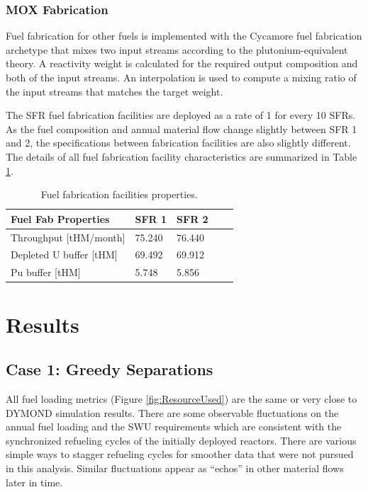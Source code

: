 \documentclass[12pt]{article}
\begin{document}
\subsubsection{MOX Fabrication}

Fuel fabrication for other fuels is implemented with the Cycamore fuel
fabrication archetype that mixes two input streams according to the
plutonium-equivalent theory\cite{Pueq}. A reactivity weight is calculated for
the required output composition and both of the input streams. An interpolation
is used to compute a mixing ratio of the input streams that matches the target
weight.

The SFR fuel fabrication facilities are deployed as a rate of 1 for every 10
SFRs. As the fuel composition and annual material flow change slightly between
SFR 1 and 2, the specifications between fabrication facilities are also slightly
different. The details of all fuel fabrication facility characteristics are
summarized in Table \ref{tab:fuelfab_1}.

\begin{table}[h!]
    \centering
    \begin{tabular}{lllll}
    \hline
    Fuel Fab Properties      &  SFR 1   &  SFR 2   \\
    \hline
    Throughput [tHM/month]   &  75.240  &  76.440  \\
    Depleted U buffer [tHM]  &  69.492  &  69.912  \\
    Pu buffer  [tHM]         &  5.748   &  5.856   \\
    \hline
    \end{tabular}
    \caption{Fuel fabrication facilities properties.}
    \label{tab:fuelfab_1}
\end{table}


\section{Results}

\subsection{Case 1: Greedy Separations}

All fuel loading metrics (Figure \ref{fig:ResourceUsed}) are the same or very
close to DYMOND simulation results. There are some observable fluctuations on the
annual fuel loading and the SWU requirements which are consistent with the
synchronized refueling cycles of the initially deployed reactors.  There are
various simple ways to stagger refueling cycles for smoother data that were not
pursued in this analysis.  Similar fluctuations appear as ``echos'' in other
material flows later in time.
\end{document}
